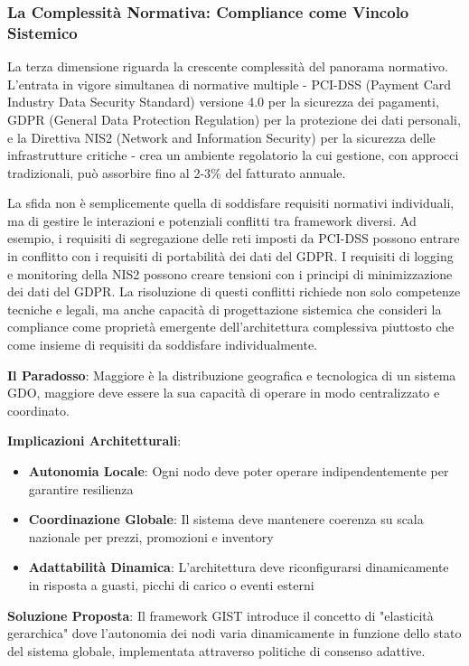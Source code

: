 \subsubsection{La Complessità Normativa: Compliance come Vincolo Sistemico}

La terza dimensione riguarda la crescente complessità del panorama normativo. L'entrata in vigore simultanea di normative multiple - PCI-DSS (Payment Card Industry Data Security Standard) versione 4.0 per la sicurezza dei pagamenti, GDPR (General Data Protection Regulation) per la protezione dei dati personali, e la Direttiva NIS2 (Network and Information Security) per la sicurezza delle infrastrutture critiche - crea un ambiente regolatorio la cui gestione, con approcci tradizionali, può assorbire fino al 2-3\% del fatturato annuale\autocite{ponemon2024compliance}.

La sfida non è semplicemente quella di soddisfare requisiti normativi individuali, ma di gestire le interazioni e potenziali conflitti tra framework diversi. Ad esempio, i requisiti di segregazione delle reti imposti da PCI-DSS possono entrare in conflitto con i requisiti di portabilità dei dati del GDPR. I requisiti di logging e monitoring della NIS2 possono creare tensioni con i principi di minimizzazione dei dati del GDPR. La risoluzione di questi conflitti richiede non solo competenze tecniche e legali, ma anche capacità di progettazione sistemica che consideri la compliance come proprietà emergente dell'architettura complessiva piuttosto che come insieme di requisiti da soddisfare individualmente.

\begin{tcolorbox}[
    colback=blue!5!white,
    colframe=blue!75!black,
    title={\textbf{Innovation Box 1.1:} Il Paradosso della Complessità Sistemica nella GDO},
    fonttitle=\bfseries,
    boxrule=1.5pt,
    arc=2mm,
    breakable
]
\textbf{Il Paradosso}: Maggiore è la distribuzione geografica e tecnologica di un sistema GDO, maggiore deve essere la sua capacità di operare in modo centralizzato e coordinato.

\vspace{0.3cm}
\textbf{Implicazioni Architetturali}:
\begin{itemize}
    \item \textbf{Autonomia Locale}: Ogni nodo deve poter operare indipendentemente per garantire resilienza
    \item \textbf{Coordinazione Globale}: Il sistema deve mantenere coerenza su scala nazionale per prezzi, promozioni e inventory
    \item \textbf{Adattabilità Dinamica}: L'architettura deve riconfigurarsi dinamicamente in risposta a guasti, picchi di carico o eventi esterni
\end{itemize}

\vspace{0.3cm}
\textbf{Soluzione Proposta}: Il framework GIST introduce il concetto di "elasticità gerarchica" dove l'autonomia dei nodi varia dinamicamente in funzione dello stato del sistema globale, implementata attraverso politiche di consenso adattive.
\end{tcolorbox}

